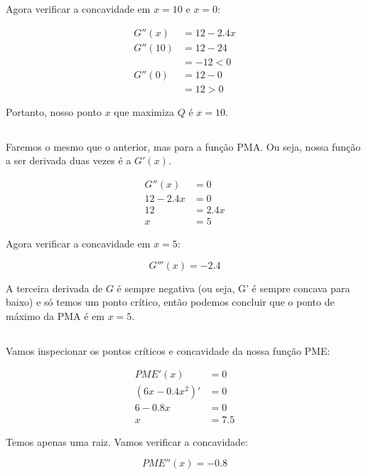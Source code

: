 \documentclass{article}
\begin{document}
Agora verificar a concavidade em \(x=10\) e \(x=0\):

\[
	\begin{aligned}
		G''(x)  & = 12 - 2.4x \\
		G''(10) & = 12 - 24   \\
		        & = -12 < 0   \\
		G''(0)  & = 12 - 0    \\
		        & = 12 > 0
	\end{aligned}
\]

Portanto, nosso ponto \(x\) que maximiza \(Q\) é \(x = 10\).

\subsection{}

Faremos o mesmo que o anterior, mas para a função PMA. Ou seja, nossa função a
ser derivada duas vezes é a \(G'(x)\).

\[
	\begin{aligned}
		G''(x)    & = 0    \\
		12 - 2.4x & = 0    \\
		12        & = 2.4x \\
		x         & = 5
	\end{aligned}
\]

Agora verificar a concavidade em \(x=5\):

\[
	G'''(x)  = - 2.4
\]

A terceira derivada de \(G\) é sempre negativa (ou seja, G' é sempre concava
para baixo) e só temos um ponto crítico, então podemos concluir que o ponto de
máximo da PMA é em \(x=5\).

\subsection{}

Vamos inspecionar os pontos críticos e concavidade da nossa função PME:

\[
	\begin{aligned}
		PME'(x)        & = 0   \\
		(6x - 0.4x^2)' & = 0   \\
		6 - 0.8x       & = 0   \\
		x              & = 7.5
	\end{aligned}
\]

Temos apenas uma raiz. Vamos verificar a concavidade:

\[
	PME''(x) = -0.8
\]
\end{document}
